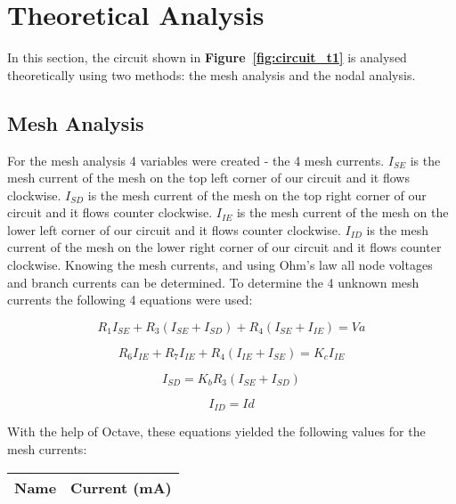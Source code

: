 \section{Theoretical Analysis}
\label{sec:analysis}

In this section, the circuit shown in \textbf{Figure~\ref{fig:circuit_t1}} is analysed
theoretically using two methods: the mesh analysis and the nodal analysis.\par

\subsection{Mesh Analysis} 

For the mesh analysis 4 variables were created - the 4 mesh currents. {\it$I_{SE}$ } is the mesh current of the mesh on the top left corner of our circuit and it flows clockwise. {\it$I_{SD}$} is the mesh current of the mesh on the top right corner of our circuit and it flows counter clockwise. {\it$I_{IE}$ } is the mesh current of the mesh on the lower left corner of our circuit and it flows counter clockwise. {\it$I_{ID}$} is the mesh current of the mesh on the lower right corner of our circuit and it flows counter clockwise. Knowing the mesh currents, and using Ohm's law all node voltages and branch currents can be determined. To determine the 4 unknown mesh currents the following 4 equations were used:

\begin {equation}
	R_1I_{SE} + R_3(I_{SE}+I_{SD}) + R_4(I_{SE}+I_{IE}) = Va
	\label{eq:m1}
\end{equation}

\begin {equation}
	R_6I_{IE} + R_7I_{IE} + R_4(I_{IE}+I_{SE}) = K_cI_{IE}
	\label{eq:m2}
\end{equation}

\begin {equation}
	I_{SD} = K_bR_3(I_{SE}+I_{SD})
	\label{eq:m3}
\end{equation}

\begin {equation}
	I_{ID} = Id
	\label{eq:m4}
\end{equation}

With the help of Octave, these equations yielded the following values for the mesh currents:\par

\begin{table}[h]
  \centering
  \begin{tabular}{|l|r|}
    \hline    
    {\bf Name} & {\bf Current (mA)}\\ \hline
    
  \end{tabular}
  \label{tab:theoretical_curr}
\end{table}

